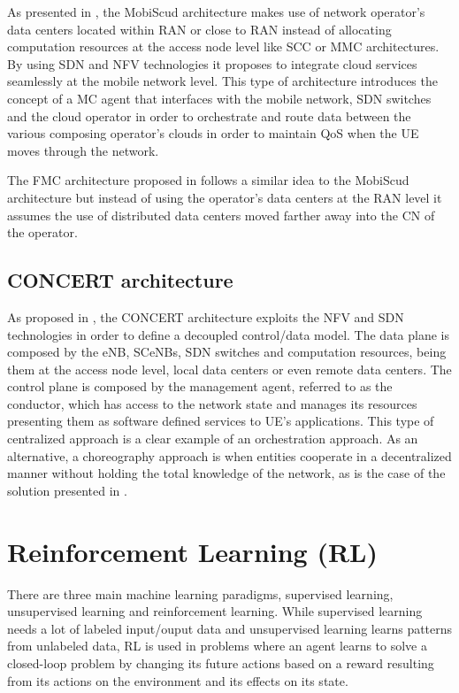 As presented in \cite{MobiScud}, the \acrfull{MobiScud} architecture makes use of network operator's data centers located within \acrshort{RAN} or close to \acrshort{RAN} instead of allocating computation resources at the access node level like \acrshort{SCC} or \acrshort{MMC} architectures. By using \acrfull{SDN} and \acrfull{NFV} technologies it proposes to integrate cloud services seamlessly at the mobile network level. This type of architecture introduces the concept of a \acrfull{MC} agent that interfaces with the mobile network, \acrshort{SDN} switches and the cloud operator in order to orchestrate and route data between the various composing operator's clouds in order to maintain \acrshort{QoS} when the \acrshort{UE} moves through the network.

The \acrfull{FMC} architecture proposed in \cite{fmcloud} follows a similar idea to the \acrshort{MobiScud} architecture but instead of using the operator's data centers at the RAN level it assumes the use of distributed data centers moved farther away into the \acrfull{CN} of the operator.

\subsection{CONCERT architecture}
\noindent As proposed in \cite{CONCERT}, the CONCERT architecture exploits the \acrshort{NFV} and \acrshort{SDN} technologies in order to define a decoupled control/data model.
The data plane is composed by the \acrshort{eNB}, \acrshort{SCeNBs}, \acrshort{SDN} switches and computation resources, being them at the access node level, local data centers or even remote data centers.
The control plane is composed by the management agent, referred to as the conductor, which has access to the network state and manages its resources presenting them as software defined services to \acrshort{UE}'s applications. This type of centralized approach is a clear example of an orchestration approach. As an alternative, a choreography approach is when entities cooperate in a decentralized manner without holding the total knowledge of the network, as is the case of the solution presented in \cite{fogmulti}.


\section{Reinforcement Learning (RL)} \label{section:RL}
\noindent There are three main machine learning paradigms, supervised learning, unsupervised learning and reinforcement learning. While supervised learning needs a lot of labeled input/ouput data and unsupervised learning learns patterns from unlabeled data, \acrfull{RL} is used in problems where an agent learns to solve a closed-loop problem by changing its future actions based on a reward resulting from its actions on the environment and its effects on its state.

